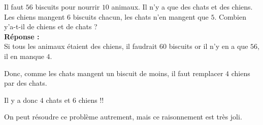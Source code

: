 Il faut $56$ biscuits pour nourrir $10$ animaux. Il n'y a que des chats et des 
chiens. Les chiens mangent $6$ biscuits chacun, les chats n'en mangent que $5$. 
Combien y'a-t-il de chiens et de chats ?\\

\textbf{Réponse :}\\

Si tous les animaux étaient des chiens, il faudrait $60$ biscuits or il n'y 
en a que $56$, il en manque $4$.

Donc, comme les chats mangent un biscuit de moins, il faut remplacer $4$ 
chiens par des chats.

Il y a donc $4$ chats et $6$ chiens !!

On peut résoudre ce problème autrement, mais ce raisonnement est très joli.

